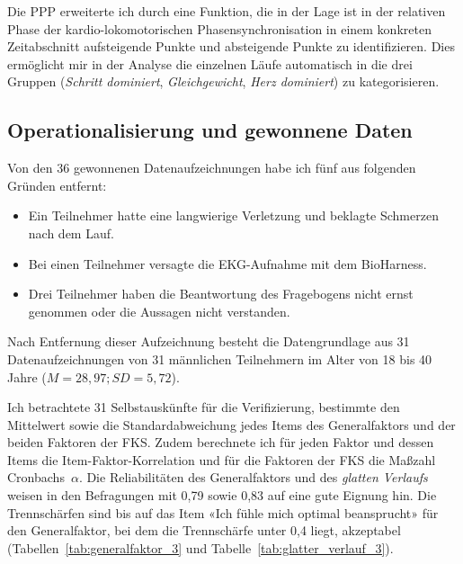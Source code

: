 Die \ac{PPP} erweiterte ich durch eine Funktion, die in der Lage ist in der relativen Phase der kardio-lokomotorischen Phasensynchronisation in einem konkreten Zeitabschnitt aufsteigende Punkte und absteigende Punkte zu identifizieren. Dies ermöglicht mir in der Analyse die einzelnen Läufe automatisch in die drei Gruppen (\emph{Schritt dominiert}, \emph{Gleichgewicht}, \emph{Herz dominiert}) zu kategorisieren. 

\subsection{Operationalisierung und gewonnene Daten} 

\label{sub:operationalisierung_und_gewonnene_daten_5_3}

Von den 36 gewonnenen Datenaufzeichnungen habe ich fünf aus folgenden Gründen entfernt: 
\begin{itemize}
	
	\item Ein Teilnehmer hatte eine langwierige Verletzung und beklagte Schmerzen nach dem Lauf.
	
	\item Bei einen Teilnehmer versagte die \ac{EKG}-Aufnahme mit dem BioHarness.
	
	\item Drei Teilnehmer haben die Beantwortung des Fragebogens nicht ernst genommen oder die Aussagen nicht verstanden. 
\end{itemize}

Nach Entfernung dieser Aufzeichnung besteht die Datengrundlage aus 31 Datenaufzeichnungen von 31 männlichen Teilnehmern im Alter von 18 bis 40 Jahre ($M = 28{,}97; SD = 5{,}72$).

Ich betrachtete 31 Selbstauskünfte für die Verifizierung, bestimmte den Mittelwert sowie die Standardabweichung jedes Items des Generalfaktors und der beiden Faktoren der \ac{FKS}. Zudem berechnete ich für jeden Faktor und dessen Items die Item-Faktor-Korrelation und für die Faktoren der \ac{FKS} die Maßzahl Cronbachs~$\alpha$. Die Reliabilitäten des Generalfaktors und des \emph{glatten Verlaufs} weisen in den Befragungen mit 0,79 sowie 0,83 auf eine gute Eignung hin. Die Trennschärfen sind bis auf das Item «Ich fühle mich optimal beansprucht» für den Generalfaktor, bei dem die Trennschärfe unter 0,4 liegt, akzeptabel (Tabellen~\ref{tab:generalfaktor_3} und Tabelle~\ref{tab:glatter_verlauf_3}).

